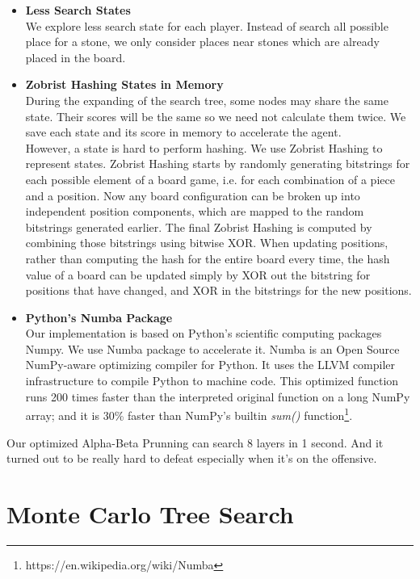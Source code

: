 \documentclass[12pt,a4paper]{article}
\begin{document}
\begin{itemize}
\item \textbf{Less Search States}\\
We explore less search state for each player. Instead of search all possible place for a stone, we only consider places near stones which are already placed in the board. 
\item \textbf{Zobrist Hashing States in Memory}\\
During the expanding of the search tree, some nodes may share the same state. Their scores will be the same so we need not calculate them twice. We save each state and its score in memory to accelerate the agent.\\
However, a state is hard to perform hashing. We use Zobrist Hashing to represent states. Zobrist Hashing starts by randomly generating bitstrings for each possible element of a board game, i.e. for each combination of a piece and a position. Now any board configuration can be broken up into independent position components, which are mapped to the random bitstrings generated earlier. The final Zobrist Hashing is computed by combining those bitstrings using bitwise XOR. When updating positions, rather than computing the hash for the entire board every time, the hash value of a board can be updated simply by XOR out the bitstring for positions that have changed, and XOR in the bitstrings for the new positions.  
\item \textbf{Python's Numba Package}\\
Our implementation is based on Python's scientific computing packages Numpy. We use Numba package to accelerate it. Numba is an Open Source NumPy-aware optimizing compiler for Python. It uses the LLVM compiler infrastructure to compile Python to machine code. This optimized function runs 200 times faster than the interpreted original function on a long NumPy array; and it is 30\% faster than NumPy's builtin \emph{sum()} function\footnote{https://en.wikipedia.org/wiki/Numba}.

\end{itemize}

Our optimized Alpha-Beta Prunning can search 8 layers in 1 second. And it turned out to be really hard to defeat especially when it's on the offensive.

\section{Monte Carlo Tree Search}
\end{document}
